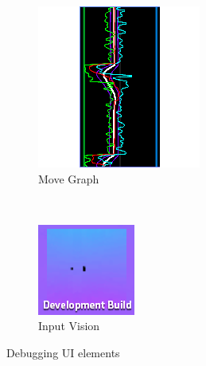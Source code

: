 \begin{figure}
    \centering
    \begin{subfigure}[b]{0.3\textwidth}
        \includegraphics[width=\textwidth]{img/uiGraph.png}
        \caption{Move Graph}
        \label{fig:uigraph}
    \end{subfigure}
    ~ %
    \begin{subfigure}[b]{0.3\textwidth}
        \includegraphics[width=\textwidth]{img/uiVision.png}
        \caption{Input Vision}
        \label{fig:uivision}
    \end{subfigure}
		\caption{Debugging UI elements}
\end{figure}

